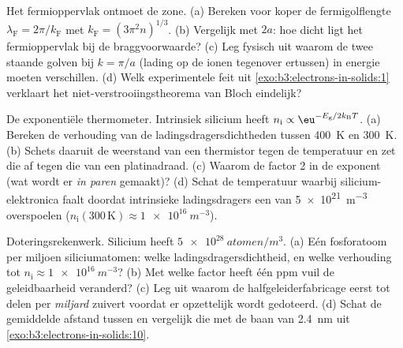 \begin{exercise}[$\star\star$]\label{exo:b3:electrons-in-solids:7}
Het fermioppervlak ontmoet de zone. (a) Bereken voor koper de
fermigolflengte $\lambda_{\text{F}} = 2\pi/k_{\text{F}}$ met
$k_{\text{F}} = (3\pi^2n)^{1/3}$. (b) Vergelijk met $2a$: hoe
dicht ligt het fermioppervlak bij de braggvoorwaarde? (c) Leg
fysisch uit waarom de twee staande golven bij $k = \pi/a$ (lading op de
ionen tegenover ertussen) in energie moeten verschillen. (d) Welk
experimentele feit uit \cref{exo:b3:electrons-in-solids:1} verklaart
het niet-verstrooiingstheorema van Bloch eindelijk?
\end{exercise}

\begin{exercise}[$\star\star$]\label{exo:b3:electrons-in-solids:8}
De exponentiële thermometer. Intrinsiek silicium heeft $n_{\text{i}}
\propto \eu^{-E_{\text{g}}/2k_{\text{B}}T}$. (a) Bereken de
verhouding van de ladingsdragersdichtheden tussen \qty{400}{K} en \qty{300}{K}. (b)
Schets daaruit de weerstand van een thermistor tegen de temperatuur en
zet die af tegen die van een platinadraad. (c) Waarom de factor 2 in de
exponent (wat wordt er \emph{in paren} gemaakt)? (d) Schat de
temperatuur waarbij silicium-elektronica faalt doordat intrinsieke
ladingsdragers een  van \qty{5e21}{m^{-3}} overspoelen
($n_{\text{i}}(300\,\text{K}) \approx \qty{1e16}{m^{-3}}$).
\end{exercise}

\begin{exercise}[$\star\star$]\label{exo:b3:electrons-in-solids:9}
Doteringsrekenwerk. Silicium heeft $\qty{5e28}{atomen/m^3}$. (a) Eén
fosforatoom per miljoen siliciumatomen: welke ladingsdragersdichtheid, en
welke verhouding tot $n_{\text{i}} \approx \qty{1e16}{m^{-3}}$? (b) Met
welke factor heeft één ppm vuil de geleidbaarheid veranderd? (c)
Leg uit waarom de halfgeleiderfabricage eerst tot delen per
\emph{miljard} zuivert voordat er opzettelijk wordt gedoteerd. (d) Schat de
gemiddelde afstand tussen  en vergelijk die met de
baan van \qty{2.4}{nm} uit \cref{exo:b3:electrons-in-solids:10}.
\end{exercise}

